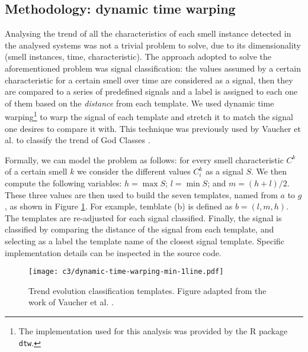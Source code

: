 \subsection{Methodology: dynamic time warping}
Analysing the trend of all the characteristics of each smell instance detected in the analysed systems was not a trivial problem to solve, due to its dimensionality (smell instances, time, characteristic).
The approach adopted to solve the aforementioned problem was signal classification: the values assumed by a certain characteristic for a certain smell over time are considered as a signal, then they are compared to a series of predefined signals and a label is assigned to each one of them based on the \emph{distance} from each template.
We used dynamic time warping\footnote{The implementation used for this analysis was provided by the R package \texttt{dtw}.} \cite{Kruskal1983} to warp the signal of each template and stretch it to match the signal one desires to compare it with. 
This technique was previously used by Vaucher et al. to classify the trend of God Classes \cite{Vaucher2009}.

Formally, we can model the problem as follows: for every smell characteristic $C^{k}$ of a certain smell $k$ we consider the different values $C^{k}_i$ as a signal $S$. We then compute the following variables: $h = \max S$; $l = \min S$; and $m = (h+l)/2$.
These three values are then used to build the seven templates, named from $a$ to $g$, as shown in Figure \ref{c3:fig:classification-templates}. For example, temblate (b) is defined as $b = (l, m, h)$.
The templates are re-adjusted for each signal classified.
Finally, the signal is classified by comparing the distance of the signal from each template, and selecting as a label the template name of the closest signal template. 
Specific implementation details can be inspected in the source code.

\begin{figure}[]
    \centering
    \texttt{[image: c3/dynamic-time-warping-min-1line.pdf]}
    \caption{Trend evolution classification templates. Figure adapted from the work of Vaucher et al. \cite{Vaucher2009}.}\label{c3:fig:classification-templates}
\end{figure}

